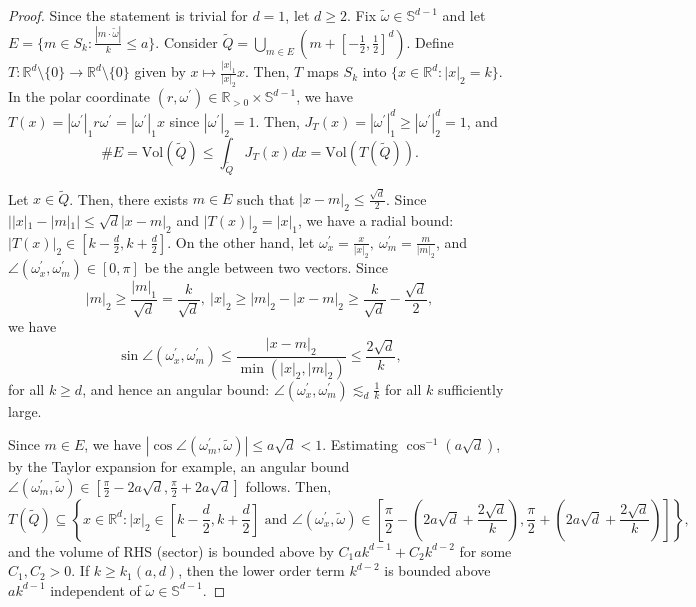 \documentclass{article}
\numberwithin{equation}{section}
\begin{document}
\begin{proof}

Since the statement is trivial for $d=1$, let $d \geq 2$. Fix $\tilde{\omega} \in \mathbb{S}^{d-1}$ and let $E = \{m \in S_k: \frac{|m \cdot \tilde{\omega}|}{k} \leq a\}$. Consider $\tilde{Q} = \bigcup\limits_{m \in E} (m + [-\frac{1}{2},\frac{1}{2}]^d)$. Define $T:\mathbb{R}^d \setminus \{0\} \rightarrow \mathbb{R}^d \setminus \{0\}$ given by $x \mapsto \frac{|x|_{1}}{|x|_{2}}x$. Then, $T$ maps $S_k$ into $\{x \in \mathbb{R}^d: |x|_2 = k\}$. In the polar coordinate $(r,\omega^\prime) \in \mathbb{R}_{>0} \times \mathbb{S}^{d-1}$, we have $T(x) = |\omega^\prime|_{1} r \omega^{\prime} = |\omega^\prime|_{1} x$ since $|\omega^{\prime}|_2 = 1$. Then, $J_T(x) = | \omega^\prime |_{1}^d \geq | \omega^\prime |_{2}^d = 1$, and
\begin{equation*}
\# E = \text{Vol}(\tilde{Q}) \leq \int_{\tilde{Q}} J_T(x) dx = \text{Vol}(T(\tilde{Q})).   
\end{equation*}

Let $x \in \tilde{Q}$. Then, there exists $m \in E$ such that $|x-m|_2 \leq \frac{\sqrt{d}}{2}$. Since $||x|_1 - |m|_1| \leq \sqrt{d}|x-m|_2$ and $|T(x)|_2 = |x|_1$, we have a radial bound: $|T(x)|_2 \in [k - \frac{d}{2},k + \frac{d}{2}]$. On the other hand, let $\omega^\prime_x = \frac{x}{|x|_2},\ \omega^\prime_m = \frac{m}{|m|_2}$, and $\angle(\omega^\prime_{x},\omega^\prime_{m}) \in [0,\pi]$ be the angle between two vectors. Since 
\begin{equation*}
|m|_2 \geq \frac{|m|_1}{\sqrt{d}} = \frac{k}{\sqrt{d}},\ |x|_2 \geq |m|_2 - |x-m|_2 \geq \frac{k}{\sqrt{d}} - \frac{\sqrt{d}}{2},
\end{equation*}
we have
\begin{equation*}
    \sin \angle(\omega^\prime_{x},\omega^\prime_{m}) \leq \frac{|x-m|_2}{\min (|x|_2,|m|_2)} \leq \frac{2 \sqrt{d}}{k},
\end{equation*}
for all $k \geq d$, and hence an angular bound: $\angle(\omega^\prime_{x},\omega^\prime_{m}) \lesssim_d \frac{1}{k}$ for all $k$ sufficiently large.

Since $m \in E$, we have $|\cos \angle(\omega^\prime_m,\tilde{\omega})| \leq a \sqrt{d} < 1$. Estimating $\cos^{-1}(a \sqrt{d})$, by the Taylor expansion for example, an angular bound $\angle(\omega^\prime_m,\tilde{\omega}) \in [\frac{\pi}{2}-2a\sqrt{d},\frac{\pi}{2}+2a\sqrt{d}]$ follows. Then,
\begin{equation*}
T(\tilde{Q}) \subseteq \left\{x \in \mathbb{R}^{d}: |x|_2 \in [k-\frac{d}{2},k+\frac{d}{2}] \text{ and } \angle(\omega^\prime_x,\tilde{\omega}) \in [\frac{\pi}{2}-(2a\sqrt{d} + \frac{2\sqrt{d}}{k}),\frac{\pi}{2}+(2a\sqrt{d}+\frac{2\sqrt{d}}{k})]\right\},    
\end{equation*}
and the volume of RHS (sector) is bounded above by $C_1 a k^{d-1} + C_2 k^{d-2}$ for some $C_1,C_2>0$. If $k \geq k_1(a,d)$, then the lower order term $k^{d-2}$ is bounded above $ak^{d-1}$ independent of $\tilde{\omega} \in \mathbb{S}^{d-1}$.   
\end{proof}
\end{document}
